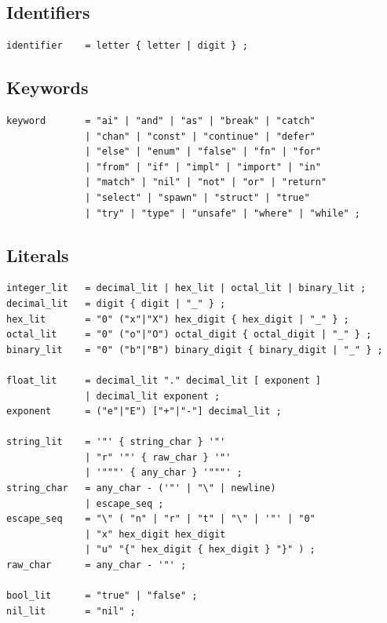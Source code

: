 \subsection{Identifiers}

\begin{lstlisting}[language=EBNF]
identifier    = letter { letter | digit } ;
\end{lstlisting}

\subsection{Keywords}

\begin{lstlisting}[language=EBNF]
keyword       = "ai" | "and" | "as" | "break" | "catch"
              | "chan" | "const" | "continue" | "defer"
              | "else" | "enum" | "false" | "fn" | "for"
              | "from" | "if" | "impl" | "import" | "in"
              | "match" | "nil" | "not" | "or" | "return"
              | "select" | "spawn" | "struct" | "true"
              | "try" | "type" | "unsafe" | "where" | "while" ;
\end{lstlisting}

\subsection{Literals}

\begin{lstlisting}[language=EBNF]
integer_lit   = decimal_lit | hex_lit | octal_lit | binary_lit ;
decimal_lit   = digit { digit | "_" } ;
hex_lit       = "0" ("x"|"X") hex_digit { hex_digit | "_" } ;
octal_lit     = "0" ("o"|"O") octal_digit { octal_digit | "_" } ;
binary_lit    = "0" ("b"|"B") binary_digit { binary_digit | "_" } ;

float_lit     = decimal_lit "." decimal_lit [ exponent ]
              | decimal_lit exponent ;
exponent      = ("e"|"E") ["+"|"-"] decimal_lit ;

string_lit    = '"' { string_char } '"'
              | "r" '"' { raw_char } '"'
              | '"""' { any_char } '"""' ;
string_char   = any_char - ('"' | "\" | newline)
              | escape_seq ;
escape_seq    = "\" ( "n" | "r" | "t" | "\" | '"' | "0"
              | "x" hex_digit hex_digit
              | "u" "{" hex_digit { hex_digit } "}" ) ;
raw_char      = any_char - '"' ;

bool_lit      = "true" | "false" ;
nil_lit       = "nil" ;
\end{lstlisting}

